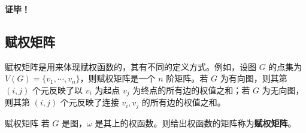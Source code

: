 \textbf{证毕！}


\subsection{赋权矩阵}

赋权矩阵是用来体现赋权函数的，其有不同的定义方式。例如，设图 $G$ 的点集为 $V(G)=\{v_1,\cdots,v_n\}$，则赋权矩阵是一个 $n$ 阶矩阵。若 $G$ 为有向图，则其第 $(i,j)$ 个元反映了以 $v_i$ 为起点 $v_j$ 为终点的所有边的权值之和；若 $G$ 为无向图，则其第 $(i,j)$ 个元反映了连接 $v_i,v_j$ 的所有边的权值之和。
\begin{definition}{赋权矩阵}
若 $G$ 是图，$\omega$ 是其上的权函数。则给出权函数的矩阵称为\textbf{赋权矩阵}。
\end{definition}









